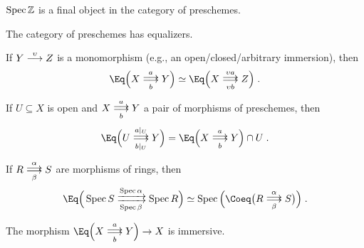 \documentclass[a4paper,parskip=half,numbers=enddot, DIV=12]{scrreprt}
\begin{document}
\begin{cor}
	$\operatorname{Spec}\mathbb{Z}$ is a final object in the category of preschemes.
\end{cor}
\begin{cor}
	\begin{alphanumerate}
		\item {}The category of preschemes has equalizers.
		\item If $Y\morphism[\upsilon]Z$ is a monomorphism (e.g., an open/closed/arbitrary immersion), then
		\begin{align*}
			\Eq\Big(X\doublemorphism[a][b]Y\Big)\simeq\Eq\Big(X\doublemorphism[\upsilon a][\upsilon b]Z\Big)\;.
		\end{align*}
		\item If $U\subseteq X$ is open and $X\doublemorphism[\smash{a}][b]Y$ a pair of morphisms of preschemes, then
		\begin{align*}
			\Eq\Big(U\doublemorphism[a|_U][b|_U]Y\Big)=\Eq\Big(X\doublemorphism[a][b]Y\Big)\cap U\;.
		\end{align*}
		\item If $R\doublemorphism[\smash{\alpha}][\smash{\beta}]S$ are morphisms of rings, then
		\begin{align*}
			\Eq\Big(\Spec S\xdoublemorphism[\Spec \alpha][\Spec \beta]\Spec R\Big)\simeq \Spec\Big(\Coeq\big(R\doublemorphism[\smash{\alpha}][\smash{\beta}]S\big)\Big)\;.
		\end{align*}
		\item The morphism $\Eq\Big(X\doublemorphism[a][b]Y\Big)\morphism X$ is immersive.
	\end{alphanumerate}
\end{cor}
\end{document}
